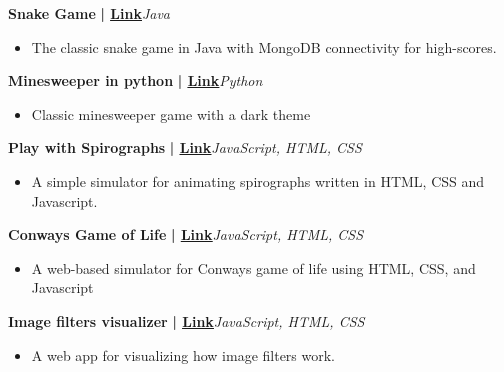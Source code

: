 \documentclass[a4paper]{article}
\begin{document}
          \vspace*{3mm}
      {\textbf{Snake Game}}\textbf{ | \href{https://github.com/syedhuzaif199/snake-mongo}{\underline{Link}}}\hfill{\sl Java}\\
          \vspace{-1mm}
\begin{itemize} \itemsep -3pt
\item[] The classic snake game in Java with MongoDB connectivity for high-scores.
\end{itemize}
          \vspace*{3mm}
      {\textbf{Minesweeper in python}}\textbf{ | \href{https://github.com/syedhuzaif199/minesweeper-python}{\underline{Link}}}\hfill{\sl Python}\\
          \vspace{-1mm}
\begin{itemize} \itemsep -3pt
\item[] Classic minesweeper game with a dark theme
\end{itemize}
          \vspace*{3mm}
      {\textbf{Play with Spirographs}}\textbf{ | \href{https://github.com/syedhuzaif199/play-with-spirographs}{\underline{Link}}}\hfill{\sl JavaScript, HTML, CSS}\\
          \vspace{-1mm}
\begin{itemize} \itemsep -3pt
\item[] A simple simulator for animating spirographs written in HTML, CSS and Javascript.
\end{itemize}
          \vspace*{3mm}
      {\textbf{Conway\textquotesingle{}s Game of Life}}\textbf{ | \href{https://github.com/syedhuzaif199/game-of-life}{\underline{Link}}}\hfill{\sl JavaScript, HTML, CSS}\\
          \vspace{-1mm}
\begin{itemize} \itemsep -3pt
\item[] A web-based simulator for Conway\textquotesingle{}s game of life using HTML, CSS, and Javascript
\end{itemize}
          \vspace*{3mm}
      {\textbf{Image filters visualizer}}\textbf{ | \href{https://github.com/syedhuzaif199/image-filters-visualization}{\underline{Link}}}\hfill{\sl JavaScript, HTML, CSS}\\
          \vspace{-1mm}
\begin{itemize} \itemsep -3pt
\item[] A web app for visualizing how image filters work.
\end{itemize}
          \vspace*{3mm}

    \ 
    
\end{document}

